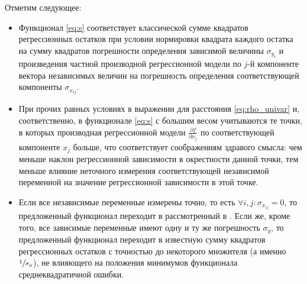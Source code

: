 \documentclass[tikz,10pt,a4paper]{article}
\begin{document}
Отметим следующее:
\begin{itemize}
  \item Функционал \eqref{eq:s} соответствует классической сумме квадратов регрессионных
	остатков при условии нормировки квадрата каждого остатка на сумму квадратов погрешности
	определения зависимой величины $\sigma_{y_i}$ и произведения частной производной
	регрессионной модели по $j$-й компоненте вектора независимых величин на погрешность
	определения соответствующей компоненты $\sigma_{x_{ij}}$.

  \item При прочих равных условиях в выражении для расстояния \eqref{eq:rho_univar} и,
	соответственно, в функционале \eqref{eq:s} с большим весом учитываются те точки, в которых
	производная регрессионной модели $\frac{\partial f}{\partial x_j}$ по соответствующей
	компоненте $x_j$ больше, что соответствует соображениям здравого смысла: чем меньше наклон
	регрессионной зависимости в окрестности данной точки, тем меньше влияние неточного
	измерения соответствующей независимой переменной на значение регрессионной зависимости
	в этой точке.

  \item Если все независимые переменные измерены точно, то есть
	$\forall i, j : \sigma_{x_{ij}} = 0$, то предложенный функционал переходит в рассмотренный
	в \cite{jukic2013nonlinear}. Если же, кроме того, все зависимые переменные имеют одну и ту
	же погрешность $\sigma_y$,
	то предложенный функционал переходит в известную сумму квадратов регрессионных остатков
	с точностью до некоторого множителя (а именно $\sfrac{1}{\sigma_y}$), не влияющего на
	положения минимумов функционала среднеквадратичной ошибки.
\end{itemize}
\end{document}
